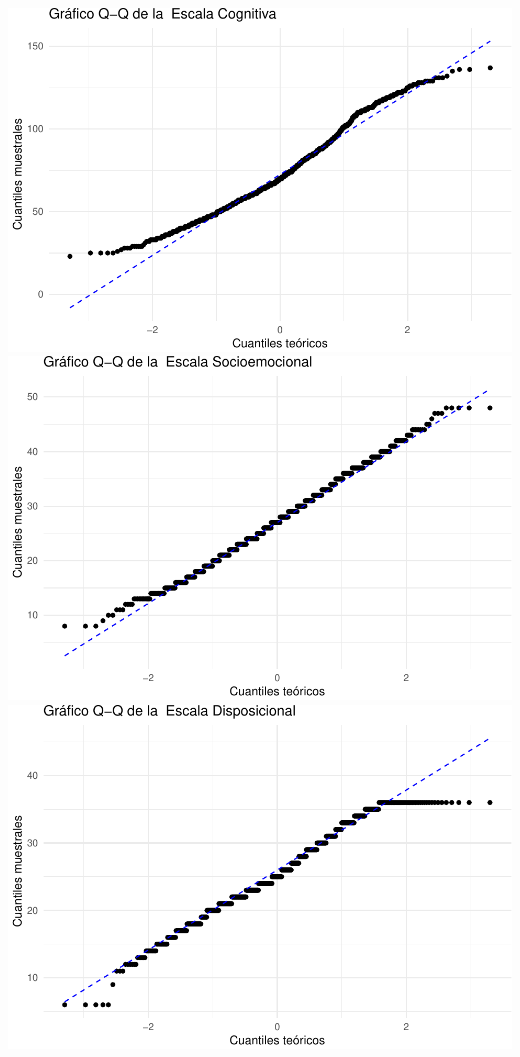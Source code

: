 \documentclass[
]{article}
\begin{document}
\includegraphics{Info_Dinix_02_files/figure-latex/30_QQ-1.pdf}
\includegraphics{Info_Dinix_02_files/figure-latex/30_QQ-2.pdf}
\includegraphics{Info_Dinix_02_files/figure-latex/30_QQ-3.pdf}
\end{document}
